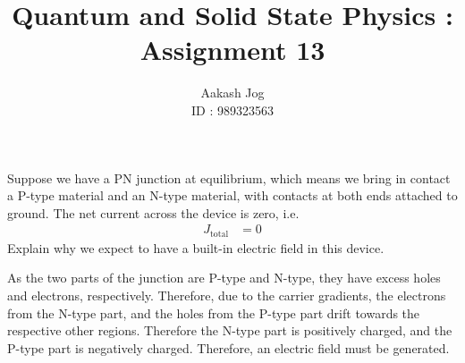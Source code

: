 \documentclass[fleqn, a4paper, 11pt, oneside]{amsart}
\title{Quantum and Solid State Physics : Assignment 13}
\author
{
	Aakash Jog\\
	ID : 989323563
}
\date{\formatdate{19}{1}{2016}}
\theoremstyle{definition}
\theoremstyle{theorem}
\begin{document}

\maketitle

\begin{question}
	Suppose we have a PN junction at equilibrium, which means we bring in contact a P-type material and an N-type material, with contacts at both ends attached to ground.
	The net current across the device is zero, i.e.
	\begin{align*}
		J_{\text{total}} & = 0
	\end{align*}
	Explain why we expect to have a built-in electric field in this device.
\end{question}

\begin{solution}
	As the two parts of the junction are P-type and N-type, they have excess holes and electrons, respectively.
	Therefore, due to the carrier gradients, the electrons from the N-type part, and the holes from the P-type part drift towards the respective other regions.
	Therefore the N-type part is positively charged, and the P-type part is negatively charged.
	Therefore, an electric field must be generated.
\end{solution}
\end{document}
